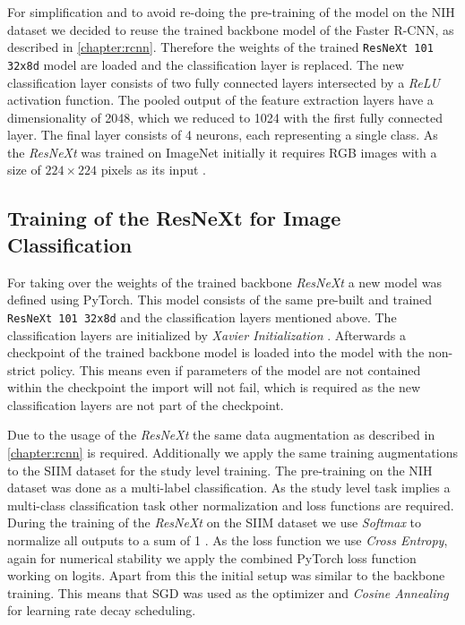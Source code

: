 For simplification and to avoid re-doing the pre-training of the model on the NIH dataset we decided to reuse the trained backbone model of the Faster R-CNN, as described in \ref{chapter:rcnn}. Therefore the weights of the trained \texttt{ResNeXt 101 32x8d} model are loaded and the classification layer is replaced. The new classification layer consists of two fully connected layers intersected by a \textit{ReLU} activation function. The pooled output of the feature extraction layers have a dimensionality of 2048, which we reduced to 1024 with the first fully connected layer. The final layer consists of 4 neurons, each representing a single class. As the \textit{ResNeXt} was trained on ImageNet initially it requires RGB images with a size of $224 \times 224$ pixels as its input \autocite{xie_aggregated_2017}. 

\subsection*{Training of the ResNeXt for Image Classification}
For taking over the weights of the trained backbone \textit{ResNeXt} a new model was defined using PyTorch. This model consists of the same pre-built and trained \texttt{ResNeXt 101 32x8d} and the classification layers mentioned above. The classification layers are initialized by \textit{Xavier Initialization} \autocite{glorot2010understanding}. Afterwards a checkpoint of the trained backbone model is loaded into the model with the non-strict policy. This means even if parameters of the model are not contained within the checkpoint the import will not fail, which is required as the new classification layers are not part of the checkpoint.

Due to the usage of the \textit{ResNeXt} the same data augmentation as described in \ref{chapter:rcnn} is required. Additionally we apply the same training augmentations to the SIIM dataset for the study level training. The pre-training on the NIH dataset was done as a multi-label classification. As the study level task implies a multi-class classification task other normalization and loss functions are required. During the training of the \textit{ResNeXt} on the SIIM dataset we use \textit{Softmax} to normalize all outputs to a sum of 1 \autocite{goodfellow2016deep}. As the loss function we use \textit{Cross Entropy}, again for numerical stability we apply the combined PyTorch loss function working on logits. Apart from this the initial setup was similar to the backbone training. This means that \ac{SGD} was used as the optimizer and \textit{Cosine Annealing} for learning rate decay scheduling. 

